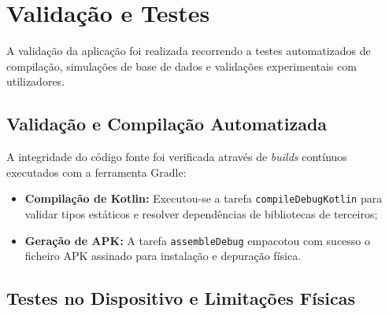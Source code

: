 

\chapter{Validação e Testes}
\label{ch:validacaoTestes}

A validação da aplicação foi realizada recorrendo a testes automatizados de compilação, simulações de base de dados e validações experimentais com utilizadores.

\section{Validação e Compilação Automatizada}
\label{sec:testesCompilacao}

A integridade do código fonte foi verificada através de \textit{builds} contínuos executados com a ferramenta Gradle:
\begin{itemize}
    \item \textbf{Compilação de Kotlin:} Executou-se a tarefa \texttt{compileDebugKotlin} para validar tipos estáticos e resolver dependências de bibliotecas de terceiros;
    \item \textbf{Geração de APK:} A tarefa \texttt{assembleDebug} empacotou com sucesso o ficheiro APK assinado para instalação e depuração física.
\end{itemize}


\section{Testes no Dispositivo e Limitações Físicas}
\label{sec:testesFisicos}

